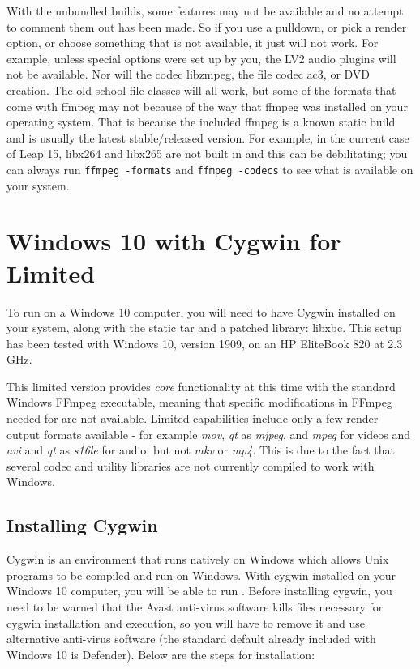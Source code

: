 With the unbundled builds, some features may not be available and
no attempt to comment them out has been made.  So if you use a
pulldown, or pick a render option, or choose something that is not
available, it just will not work.  For example, unless special
options were set up by you, the LV2 audio plugins will not be
available.  Nor will the codec libzmpeg, the file codec ac3, or
DVD creation.  The old school file classes will all work, but some
of the formats that come with ffmpeg may not because of the way
that ffmpeg was installed on your operating system.  That is
because the \CGG{} included ffmpeg is a known static build and is
usually the latest stable/released version.  For example, in the
current case of Leap 15, libx264 and libx265 are not built in and
this can be debilitating; you can always run \texttt{ffmpeg
  -formats} and \texttt{ffmpeg -codecs} to see what is available
on your system.

\section{Windows 10 with Cygwin for \CGG{} Limited}%
\label{sec:ms_windows10}

To run \CGG{} on a Windows 10 computer, you will need to have
Cygwin installed on your system, along with the \CGG{} static tar
and a patched library: libxbc.  This setup has been tested with
Windows 10, version 1909, on an HP EliteBook 820 at 2.3 GHz.

This limited version provides \textit{core} functionality at this
time with the standard Windows FFmpeg executable, meaning that
specific modifications in FFmpeg needed for \CGG{} are not
available.  Limited capabilities include only a few render output
formats available - for example \textit{mov}, \textit{qt} as
\textit{mjpeg}, and \textit{mpeg} for videos and \textit{avi} and
\textit{qt} as \textit{s16le} for audio, but not \textit{mkv} or
\textit{mp4}.  This is due to the fact that several codec and
utility libraries are not currently compiled to work with Windows.

\subsection*{Installing Cygwin}
\label{sec:installing_cygwin}

Cygwin is an environment that runs natively on Windows which
allows Unix programs to be compiled and run on Windows.  With
cygwin installed on your Windows 10 computer, you will be able to
run \CGG{}.  Before installing cygwin, you need to be warned that
the Avast anti-virus software kills files necessary for cygwin
installation and execution, so you will have to remove it and use
alternative anti-virus software (the standard default already
included with Windows 10 is Defender). Below are the steps for
installation:

